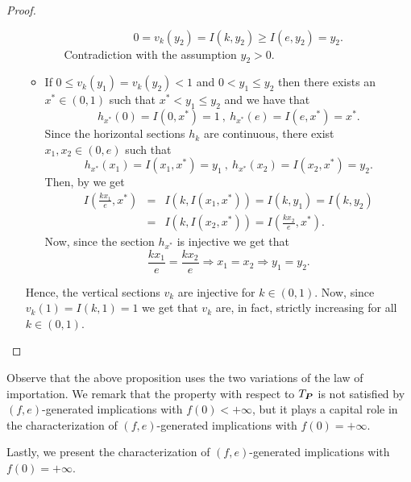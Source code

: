\begin{proof}
\begin{enumerate}[label=(\roman*)]
\begin{itemize}
\begin{itemize}
				$$0=v_k(y_2)=I(k,y_2) \geq I(e,y_2)=y_2.$$
				Contradiction with the assumption $y_2>0$.
			\end{itemize}
			\item  If $0 \leq v_k(y_1)=v_k(y_2)<1$ and $0<y_1 \leq y_2$ then there exists an $x^{*} \in (0,1)$ such that $x^{*}<y_1 \leq y_2$ and we have that
			$$h_{x^{*}}(0)=I(0,x^{*})=1 ~,~ h_{x^{*}}(e)=I(e,x^{*})=x^{*}.$$
			Since the horizontal sections $h_k$ are continuous, there exist $x_1,x_2 \in (0,e)$ such that
			$$h_{x^*}(x_1)=I(x_1,x^{*})=y_1 ~,~ h_{x^*}(x_2)=I(x_2,x^{*})=y_2.$$
			Then, by \LIey we get
			\begin{eqnarray*}
			I\left(\frac{kx_1}{e},x^{*}\right) &=& I(k,I(x_1,x^{*}))=I(k,y_1) = I(k,y_2) \\
			&=& I(k,I(x_2,x^{*}))=I\left(\frac{kx_2}{e},x^{*}\right).
			\end{eqnarray*}
			Now, since the section $h_{x^*}$ is injective we get that
			$$\frac{kx_1}{e}=\frac{kx_2}{e} \Rightarrow x_1=x_2 \Rightarrow y_1=y_2.$$
		\end{itemize}
		Hence, the vertical sections $v_k$ are injective for $k \in (0,1)$. Now, since $v_k(1)=I(k,1)=1$ we get that $v_k$ are, in fact, strictly increasing for all $k \in (0,1)$.
	\end{enumerate}
\end{proof}

Observe that the above proposition uses the two variations of the law of importation. We remark that the property \LIex with respect to $T_{\bm{P}}$ is not satisfied by $(f,e)$-generated implications with $f(0)<+\infty$, but it plays a capital role in the characterization of $(f,e)$-generated implications with $f(0)=+\infty$.

Lastly, we present the characterization of $(f,e)$-generated implications with $f(0)=+\infty$.

